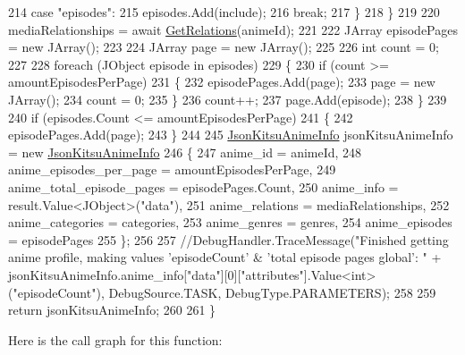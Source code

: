 \begin{DoxyCode}
214                     \textcolor{keywordflow}{case} \textcolor{stringliteral}{"episodes"}:
215                         episodes.Add(include);
216                         \textcolor{keywordflow}{break};
217                 \}
218             \}
219 
220             mediaRelationships = await \mbox{\hyperlink{class_little_weeb_library_1_1_handlers_1_1_kitsu_handler_ad1ba51037e72c80804018f4c1df37581}{GetRelations}}(animeId);
221 
222             JArray episodePages = \textcolor{keyword}{new} JArray();
223 
224             JArray page = \textcolor{keyword}{new} JArray();
225 
226             \textcolor{keywordtype}{int} count = 0;
227 
228             \textcolor{keywordflow}{foreach} (JObject episode \textcolor{keywordflow}{in} episodes)
229             \{
230                 \textcolor{keywordflow}{if} (count >= amountEpisodesPerPage)
231                 \{
232                     episodePages.Add(page);
233                     page = \textcolor{keyword}{new} JArray();
234                     count = 0;
235                 \}
236                 count++;
237                 page.Add(episode);
238             \}
239 
240             \textcolor{keywordflow}{if} (episodes.Count <= amountEpisodesPerPage)
241             \{
242                 episodePages.Add(page);
243             \}
244 
245             \mbox{\hyperlink{class_little_weeb_library_1_1_models_1_1_json_kitsu_anime_info}{JsonKitsuAnimeInfo}} jsonKitsuAnimeInfo = \textcolor{keyword}{new} 
      \mbox{\hyperlink{class_little_weeb_library_1_1_models_1_1_json_kitsu_anime_info}{JsonKitsuAnimeInfo}}
246             \{
247                 anime\_id = animeId,
248                 anime\_episodes\_per\_page = amountEpisodesPerPage,
249                 anime\_total\_episode\_pages = episodePages.Count,
250                 anime\_info = result.Value<JObject>(\textcolor{stringliteral}{"data"}),
251                 anime\_relations = mediaRelationships,
252                 anime\_categories = categories,
253                 anime\_genres = genres,
254                 anime\_episodes = episodePages
255             \};
256             
257            \textcolor{comment}{//DebugHandler.TraceMessage("Finished getting anime profile, making values 'episodeCount' &
       'total episode pages global': " +
       jsonKitsuAnimeInfo.anime\_info["data"][0]["attributes"].Value<int>("episodeCount"), DebugSource.TASK, DebugType.PARAMETERS);            }
258 
259             \textcolor{keywordflow}{return} jsonKitsuAnimeInfo;
260 
261         \}
\end{DoxyCode}
Here is the call graph for this function\+:\nopagebreak
